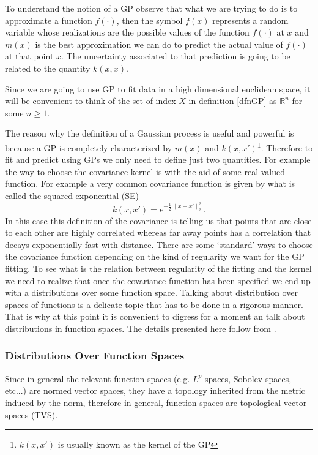 \documentclass[12pt]{book}
\begin{document}
To understand the notion of a GP observe that what  
we are trying to do is to approximate a function $f(\cdot)$, then
the symbol $f(x)$ represents a random variable whose realizations are  the possible values of the
 function $f(\cdot)$ at $x$ and $m(x)$ is the best approximation we can do to predict the actual value 
of $f(\cdot)$ at that point $x$. The uncertainty associated to that prediction is going to be related
to the quantity $k(x,x)$.

Since we are going to use GP to fit  data in a high dimensional euclidean space, it will be convenient to think
of the set of index $X$ in definition \ref{dfnGP} as $\mathbb{R}^{n}$ for some $n\geq 1$. 
\newline

The reason why the definition of a Gaussian process is useful and powerful is because a GP is 
completely characterized by $m(x)$ and $k(x,x')$\footnote{ $k(x,x')$ 
is usually known as the kernel of the GP}\cite{lifshits2012lectures}. Therefore to fit and 
predict using GPs we only need to define just two quantities. For example the way to choose
the covariance kernel is with the aid of some real valued function. For example a very common covariance
function is given by what is called the squared exponential (SE)
\begin{equation}\label{eqnsquareexponential}
k(x,x')=e^{-\frac{1}{2}\|x-x'\|_{2}^{2}}.
\end{equation}
In this case this definition of the covariance is telling us that points that are close to each other
are highly correlated whereas far away points has a correlation that decays exponentially fast with distance.
There are some `standard' ways to choose the covariance function depending on the kind
of regularity we want for the GP fitting. To see what is the relation between regularity
of the fitting and the kernel we need to realize that once the covariance function has been 
specified we end up with a distributions over some function space. Talking 
about distribution over spaces of functions is a delicate topic that has to be done in a rigorous manner.
That is why at this point it is convenient to digress for a moment an talk about distributions in 
function spaces. The details presented here follow from \cite{lifshits2012lectures}.

\subsubsection{Distributions Over Function Spaces}
Since in general the relevant function spaces (e.g. $L^{p}$ spaces, Sobolev spaces, etc...) are 
normed vector spaces, they have a topology inherited from the metric induced by the norm, therefore 
in general, function spaces are topological vector spaces (TVS). 
\end{document}
